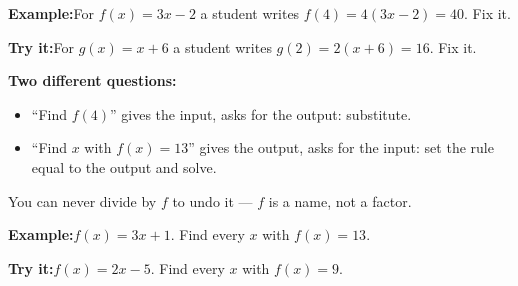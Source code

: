 \documentclass[12pt]{article}
\begin{document}
\begin{examplebox}
\textbf{Example:}\quad For $f(x) = 3x - 2$ a student writes $f(4) = 4(3x - 2) = 40$. Fix it.
\end{examplebox}

\begin{tryitbox}
\textbf{Try it:}\quad For $g(x) = x + 6$ a student writes $g(2) = 2(x + 6) = 16$. Fix it.\\[2pt]
\end{tryitbox}


\begin{formulabox}
\textbf{Two different questions:}
\begin{itemize}[leftmargin=0.8cm, itemsep=0pt, topsep=1pt]
  \item ``Find $f(4)$'' gives the input, asks for the output: substitute.
  \item ``Find $x$ with $f(x) = 13$'' gives the output, asks for the input: set the rule equal to the output and solve.
\end{itemize}
You can never divide by $f$ to undo it --- $f$ is a name, not a factor.
\end{formulabox}

\begin{examplebox}
\textbf{Example:}\quad $f(x) = 3x + 1$. Find every $x$ with $f(x) = 13$.
\end{examplebox}

\begin{tryitbox}
\textbf{Try it:}\quad $f(x) = 2x - 5$. Find every $x$ with $f(x) = 9$.\\[2pt]
\end{tryitbox}
\end{document}
